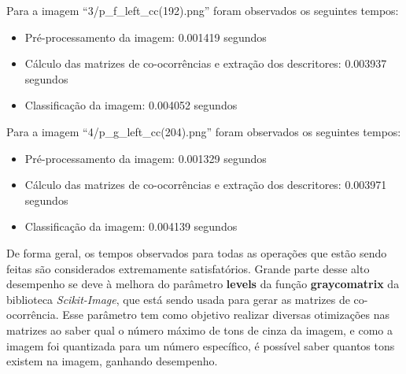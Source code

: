 \noindent
Para a imagem “3/p\_f\_left\_cc(192).png” foram observados os seguintes tempos:

\begin{itemize}
    \item Pré-processamento da imagem: 0.001419 segundos
    \item Cálculo das matrizes de co-ocorrências e extração dos descritores: 0.003937 segundos
    \item Classificação da imagem: 0.004052 segundos
\end{itemize}


\noindent
Para a imagem “4/p\_g\_left\_cc(204).png” foram observados os seguintes tempos:

\begin{itemize}
    \item Pré-processamento da imagem: 0.001329 segundos
    \item Cálculo das matrizes de co-ocorrências e extração dos descritores: 0.003971 segundos
    \item Classificação da imagem: 0.004139 segundos
\end{itemize}

De forma geral, os tempos observados para todas as operações que estão sendo feitas são 
considerados extremamente satisfatórios. Grande parte desse alto desempenho se deve à 
melhora do parâmetro \textbf{levels} da função \textbf{graycomatrix} da biblioteca \emph{Scikit-Image}, 
que está sendo usada para gerar as matrizes de co-ocorrência. Esse parâmetro tem como 
objetivo realizar diversas otimizações nas matrizes ao saber qual o número máximo de 
tons de cinza da imagem, e como a imagem foi quantizada para um número específico, é 
possível saber quantos tons existem na imagem, ganhando desempenho.
